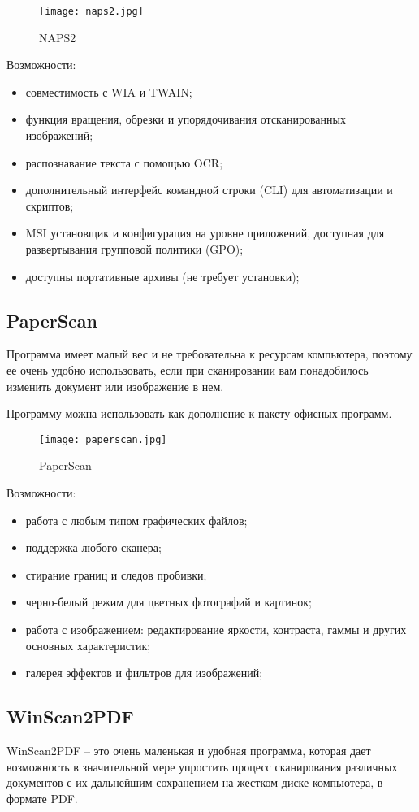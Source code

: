 \begin{figure}[h!]
\centering
	\texttt{[image: naps2.jpg]}
	\caption{NAPS2}
\end{figure}
\clearpage

Возможности:
\begin{itemize}
	\item совместимость с WIA и TWAIN;
	\item функция вращения, обрезки и упорядочивания отсканированных изображений;
	\item распознавание текста с помощью OCR;
	\item дополнительный интерфейс командной строки (CLI) для автоматизации и скриптов;
	\item MSI установщик и конфигурация на уровне приложений, доступная для развертывания групповой политики (GPO);
	\item доступны портативные архивы (не требует установки);
\end{itemize}

\subsection{PaperScan}
Программа имеет малый вес и не требовательна к ресурсам компьютера, поэтому ее очень удобно использовать, если при сканировании вам понадобилось изменить документ или изображение в нем.

Программу можна использовать как дополнение к пакету офисных программ.

\begin{figure}[h!]
\centering
	\texttt{[image: paperscan.jpg]}
	\caption{PaperScan}
\end{figure}
\clearpage

Возможности:
\begin{itemize}
	\item работа с любым типом графических файлов;
	\item поддержка любого сканера;
	\item стирание границ и следов пробивки;
	\item черно-белый режим для цветных фотографий и картинок;
	\item работа с изображением: редактирование яркости, контраста, гаммы и других основных характеристик;
	\item галерея эффектов и фильтров для изображений;
\end{itemize}

\subsection{WinScan2PDF}
WinScan2PDF – это очень маленькая и удобная программа, которая дает возможность в значительной мере упростить процесс сканирования различных документов с их дальнейшим сохранением на жестком диске компьютера, в формате PDF.

